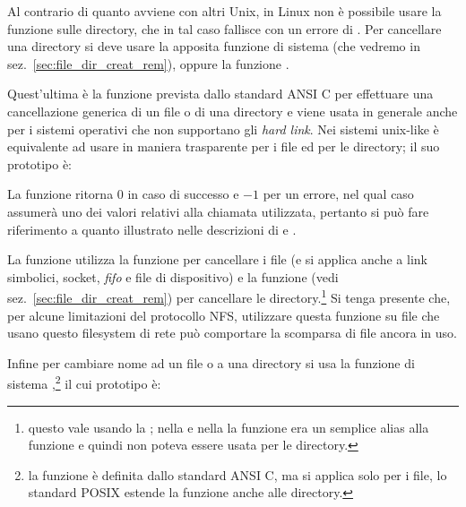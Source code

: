 Al contrario di quanto avviene con altri Unix, in Linux non è possibile usare
la funzione  sulle directory, che in tal caso fallisce con un
errore di . Per cancellare una directory si deve usare la
apposita funzione di sistema  (che vedremo in
sez.~\ref{sec:file_dir_creat_rem}), oppure la funzione .

Quest'ultima è la funzione prevista dallo standard ANSI C per effettuare una
cancellazione generica di un file o di una directory e viene usata in generale
anche per i sistemi operativi che non supportano gli \textit{hard link}. Nei
sistemi unix-like  è equivalente ad usare in maniera trasparente
 per i file ed  per le directory; il suo prototipo è:

\begin{funcproto}{
}
{La funzione ritorna $0$ in caso di successo e $-1$ per un errore, nel qual
  caso  assumerà uno dei valori relativi alla chiamata utilizzata,
  pertanto si può fare riferimento a quanto illustrato nelle descrizioni di
   e .}
\end{funcproto}

La funzione utilizza la funzione  per cancellare i file (e si
applica anche a link simbolici, socket, \textit{fifo} e file di dispositivo) e
la funzione  (vedi sez.~\ref{sec:file_dir_creat_rem}) per
cancellare le directory.\footnote{questo vale usando la ; nella
   e nella  la funzione  era un semplice
  alias alla funzione  e quindi non poteva essere usata per le
  directory.}  Si tenga presente che, per alcune limitazioni del protocollo
NFS, utilizzare questa funzione su file che usano questo filesystem di rete
può comportare la scomparsa di file ancora in uso.

Infine per cambiare nome ad un file o a una directory si usa la funzione di
sistema ,\footnote{la funzione è definita dallo standard ANSI C,
  ma si applica solo per i file, lo standard POSIX estende la funzione anche
  alle directory.} il cui prototipo è:

